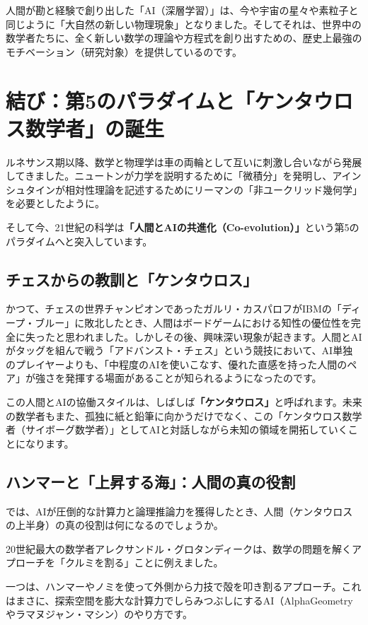 人間が勘と経験で創り出した「AI（深層学習）」は、今や宇宙の星々や素粒子と同じように「大自然の新しい物理現象」となりました。そしてそれは、世界中の数学者たちに、全く新しい数学の理論や方程式を創り出すための、歴史上最強のモチベーション（研究対象）を提供しているのです。

\section{結び：第5のパラダイムと「ケンタウロス数学者」の誕生}

ルネサンス期以降、数学と物理学は車の両輪として互いに刺激し合いながら発展してきました。ニュートンが力学を説明するために「微積分」を発明し、アインシュタインが相対性理論を記述するためにリーマンの「非ユークリッド幾何学」を必要としたように。

そして今、21世紀の科学は\textbf{「人間とAIの共進化（Co-evolution）」}という第5のパラダイムへと突入しています。

\subsection{チェスからの教訓と「ケンタウロス」}

かつて、チェスの世界チャンピオンであったガルリ・カスパロフがIBMの「ディープ・ブルー」に敗北したとき、人間はボードゲームにおける知性の優位性を完全に失ったと思われました。しかしその後、興味深い現象が起きます。人間とAIがタッグを組んで戦う「アドバンスト・チェス」という競技において、AI単独のプレイヤーよりも、「中程度のAIを使いこなす、優れた直感を持った人間のペア」が強さを発揮する場面があることが知られるようになったのです。

この人間とAIの協働スタイルは、しばしば\textbf{「ケンタウロス」}と呼ばれます。未来の数学者もまた、孤独に紙と鉛筆に向かうだけでなく、この「ケンタウロス数学者（サイボーグ数学者）」としてAIと対話しながら未知の領域を開拓していくことになります。

\subsection{ハンマーと「上昇する海」：人間の真の役割}

では、AIが圧倒的な計算力と論理推論力を獲得したとき、人間（ケンタウロスの上半身）の真の役割は何になるのでしょうか。

20世紀最大の数学者アレクサンドル・グロタンディークは、数学の問題を解くアプローチを「クルミを割る」ことに例えました。

一つは、ハンマーやノミを使って外側から力技で殻を叩き割るアプローチ。これはまさに、探索空間を膨大な計算力でしらみつぶしにするAI（AlphaGeometryやラマヌジャン・マシン）のやり方です。


